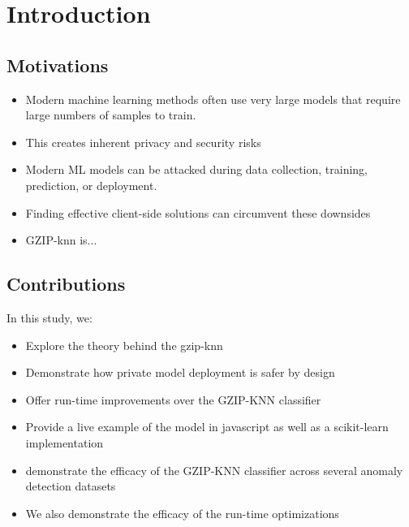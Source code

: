 \documentclass[sigconf]{acmart}
\begin{document}

\maketitle

\section{Introduction}
\subsection{Motivations}
\begin{itemize}
    \item Modern machine learning methods often use very large models that require large numbers of samples to train.
    \item This creates inherent privacy and security risks
    \item Modern ML models can be attacked during data collection, training, prediction, or deployment. 
    \item Finding effective client-side solutions can circumvent these downsides
    \item GZIP-knn is...
\end{itemize}
\subsection{Contributions}

In this study, we:

\begin{itemize}
    \item Explore the theory behind the gzip-knn 
    \item Demonstrate how private model deployment is safer by design
    \item Offer run-time improvements over the GZIP-KNN classifier
    \item Provide a live example of the model in javascript as well as a scikit-learn implementation
    \item demonstrate the efficacy of the GZIP-KNN classifier across several anomaly detection datasets
    \item We also demonstrate the efficacy of the run-time optimizations
\end{itemize}
\end{document}
